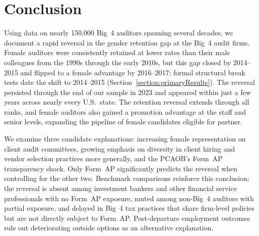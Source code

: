\documentclass[11pt]{article}
\begin{document}
\section{Conclusion} \label{section:conclusion}

    Using data on nearly 150,000 Big~4 auditors spanning several decades, we document a rapid reversal in the gender retention gap at the Big~4 audit firms. Female auditors were consistently retained at lower rates than their male colleagues from the 1990s through the early 2010s, but this gap closed by 2014--2015 and flipped to a female advantage by 2016--2017; formal structural break tests date the shift to 2014--2015 (Section~\ref{section:primaryResults}). The reversal persisted through the end of our sample in 2023 and appeared within just a few years across nearly every U.S.\ state. The retention reversal extends through all ranks, and female auditors also gained a promotion advantage at the staff and senior levels, expanding the pipeline of female candidates eligible for partner. 

    We examine three candidate explanations: increasing female representation on client audit committees, growing emphasis on diversity in client hiring and vendor selection practices more generally, and the PCAOB's Form~AP transparency shock. Only Form~AP significantly predicts the reversal when controlling for the other two. Benchmark comparisons reinforce this conclusion: the reversal is absent among investment bankers and other financial service professionals with no Form~AP exposure, muted among non-Big~4 auditors with partial exposure, and delayed in Big~4 tax practices that share firm-level policies but are not directly subject to Form~AP. Post-departure employment outcomes rule out deteriorating outside options as an alternative explanation.
\end{document}
